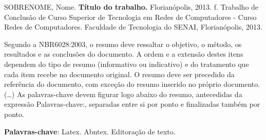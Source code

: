 
\noindent
SOBRENOME, Nome. \textbf{Título do trabalho.}
Florianópolis, 2013. \pageref{nropaginas}f. Trabalho de Conclusão de Curso Superior de Tecnologia em
Redes de Computadores - Curso Redes de Computadores. Faculdade de Tecnologia do
SENAI, Florianópolis, 2013.

\vspace{1cm}
\setlength{\absparsep}{18pt} %
\begin{resumo}
 Segundo a NBR6028:2003, o resumo deve ressaltar o
 objetivo, o método, os resultados e as conclusões do documento. A ordem e a extensão
 destes itens dependem do tipo de resumo (informativo ou indicativo) e do
 tratamento que cada item recebe no documento original. O resumo deve ser
 precedido da referência do documento, com exceção do resumo inserido no
 próprio documento. (\ldots) As palavras-chave devem figurar logo abaixo do
 resumo, antecedidas da expressão Palavras-chave:, separadas entre si por
 ponto e finalizadas também por ponto.

 \textbf{Palavras-chave}: Latex. Abntex. Editoração de texto.
\end{resumo}
